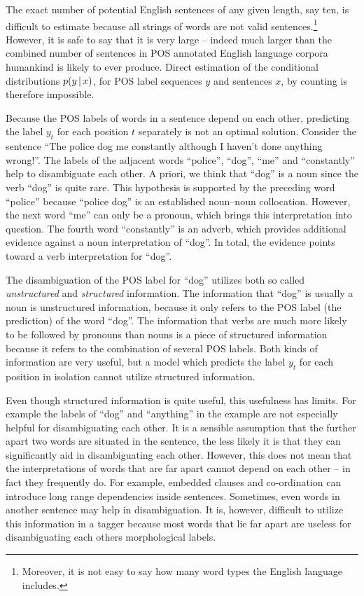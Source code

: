 The exact number of potential English sentences of any given length,
say ten, is difficult to estimate because all strings of words are not
valid sentences.\footnote{Moreover, it is not easy to say how many word
  types the English language includes.} However, it is safe to say
that it is very large -- indeed much larger than the combined number
of sentences in POS annotated English language corpora humankind is
likely to ever produce. Direct estimation of the conditional
distributions $p(y\mbox{$ \, | \, $} x)$, for POS label sequences $y$ and sentences
$x$, by counting is therefore impossible.

Because the POS labels of words in a sentence depend on each other,
predicting the label $y_t$ for each position $t$ separately is not an
optimal solution. Consider the sentence ``The police dog me constantly although I
haven't done anything wrong!''. The labels of the adjacent words
``police'', ``dog'', ``me'' and ``constantly'' help to disambiguate
each other. A priori, we think that ``dog'' is a noun since the verb
``dog'' is quite rare. This hypothesis is supported by the preceding
word ``police'' because ``police dog'' is an established noun--noun
collocation. However, the next word ``me'' can only be a pronoun,
which brings this interpretation into question. The fourth word
``constantly'' is an adverb, which provides additional evidence
against a noun interpretation of ``dog''. In total, the evidence
points toward a verb interpretation for ``dog''.

The disambiguation of the POS label for ``dog'' utilizes both so
called {\it unstructured} and {\it structured} information. The
information that ``dog'' is usually a noun is
unstructured information, because it only refers to the POS label (the
prediction) of the word ``dog''. The information that verbs are much
more likely to be followed by pronouns than nouns is a piece of
structured information because it refers to the combination of several
POS labels. Both kinds of information are very useful, but a model
which predicts the label $y_t$ for each position in isolation cannot
utilize structured information.

Even though structured information is quite useful, this usefulness
has limits. For example the labels of ``dog'' and ``anything'' in the
example are not especially helpful for disambiguating each other. It
is a sensible assumption that the further apart two words are situated
in the sentence, the less likely it is that they can significantly aid
in disambiguating each other. However, this does not mean that the
interpretations of words that are far apart cannot depend on each
other -- in fact they frequently do. For example, embedded clauses and
co-ordination can introduce long range dependencies inside
sentences. Sometimes, even words in another sentence may help in
disambiguation. It is, however, difficult to utilize this information
in a tagger because most words that lie far apart are useless for
disambiguating each others morphological labels.

